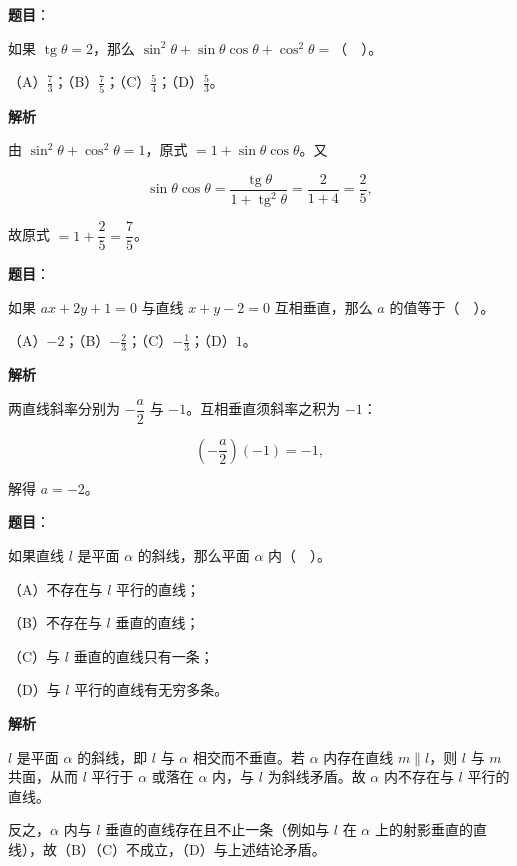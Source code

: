 \begin{answer}

\textbf{题目}：

如果 $\operatorname{tg}\theta=2$，那么 $\sin^2\theta+\sin\theta\cos\theta+\cos^2\theta=$（　）。

（A）$\frac73$；（B）$\frac75$；（C）$\frac54$；（D）$\frac53$。

\textbf{解析}

由 $\sin^2\theta+\cos^2\theta=1$，原式 $=1+\sin\theta\cos\theta$。又

\nopagebreak[4]
\[
\sin\theta\cos\theta=\frac{\operatorname{tg}\theta}{1+\operatorname{tg}^2\theta}=\frac{2}{1+4}=\frac25,
\]

故原式 $=1+\dfrac25=\dfrac75$。


\end{answer}
\begin{answer}

\textbf{题目}：

如果 $ax+2y+1=0$ 与直线 $x+y-2=0$ 互相垂直，那么 $a$ 的值等于（　）。

（A）$-2$；（B）$-\frac23$；（C）$-\frac13$；（D）$1$。

\textbf{解析}

两直线斜率分别为 $-\dfrac{a}{2}$ 与 $-1$。互相垂直须斜率之积为 $-1$：

\nopagebreak[4]
\[
\left(-\frac{a}{2}\right)(-1)=-1,
\]

解得 $a=-2$。


\end{answer}
\begin{answer}

\textbf{题目}：

如果直线 $l$ 是平面 $\alpha$ 的斜线，那么平面 $\alpha$ 内（　）。

（A）不存在与 $l$ 平行的直线；

（B）不存在与 $l$ 垂直的直线；

（C）与 $l$ 垂直的直线只有一条；

（D）与 $l$ 平行的直线有无穷多条。

\textbf{解析}

$l$ 是平面 $\alpha$ 的斜线，即 $l$ 与 $\alpha$ 相交而不垂直。若 $\alpha$ 内存在直线 $m\parallel l$，则 $l$ 与 $m$ 共面，从而 $l$ 平行于 $\alpha$ 或落在 $\alpha$ 内，与 $l$ 为斜线矛盾。故 $\alpha$ 内不存在与 $l$ 平行的直线。

反之，$\alpha$ 内与 $l$ 垂直的直线存在且不止一条（例如与 $l$ 在 $\alpha$ 上的射影垂直的直线），故（B）（C）不成立，（D）与上述结论矛盾。


\end{answer}
